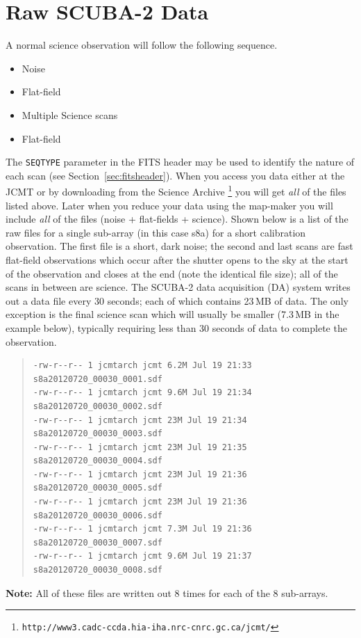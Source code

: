\documentclass[twoside,11pt]{article}
\newcommand{\htmladdnormallink}[2]{#1}
\newcommand{\htmlref}[2]{#1}
\newenvironment{latexonly}{}{}
\newcommand{\latexhtml}[2]{#1}
\newcommand{\xlabel}[1]{}
\renewcommand{\_}{\texttt{\symbol{95}}}
\newenvironment{myquote}{\begin{quote}\begin{small}}{\end{small}\end{quote}}
\newcommand{\param}[1]{\texttt{#1}}
\newcommand{\cref}[3]{\latexhtml{#1~\ref{#2}}{\htmlref{#3}{#2}}}
\begin{document}
\clearpage

\section{\xlabel{data_files}Raw SCUBA-2 Data}
\label{sec:raw}

A normal science observation will follow the following sequence.
\vspace{-2mm}
\begin{itemize}\itemsep-0.5em
\item Noise
\item Flat-field
\item Multiple Science scans
\item Flat-field
\end{itemize}
\vspace{-2mm}
The \param{SEQ\_TYPE} parameter in the FITS header may be used to
identify the nature of each scan (see
\cref{Section}{sec:fitsheader}{Headers and file structure}).
When you access you data either at the JCMT or by downloading from the
\htmladdnormallink{Science Archive}{http://www3.cadc-ccda.hia-iha.nrc-cnrc.gc.ca/jcmt/}
\begin{latexonly}
\footnote{\texttt{http://www3.cadc-ccda.hia-iha.nrc-cnrc.gc.ca/jcmt/}}
\end{latexonly}
you will get \emph{all} of the files listed above. Later when you
reduce your data using the map-maker you will include \emph{all} of
the files (noise + flat-fields + science).
Shown below is a list of the raw files for a single sub-array (in this
case s8a) for a short calibration observation. The first file is a
short, dark noise; the second and last scans are fast flat-field
observations which occur after the shutter opens to the sky at the
start of the observation and closes at the end (note the identical
file size); all of the scans in between are science. The SCUBA-2 data
acquisition (DA) system writes out a data file every 30 seconds; each
of which contains 23\,MB of data. The only exception is the final science
scan which will usually be smaller (7.3\,MB in the example below), typically
requiring less than 30 seconds of data to complete the observation.
\begin{myquote}
\begin{verbatim}
-rw-r--r-- 1 jcmtarch jcmt 6.2M Jul 19 21:33 s8a20120720_00030_0001.sdf
-rw-r--r-- 1 jcmtarch jcmt 9.6M Jul 19 21:34 s8a20120720_00030_0002.sdf
-rw-r--r-- 1 jcmtarch jcmt 23M Jul 19 21:34 s8a20120720_00030_0003.sdf
-rw-r--r-- 1 jcmtarch jcmt 23M Jul 19 21:35 s8a20120720_00030_0004.sdf
-rw-r--r-- 1 jcmtarch jcmt 23M Jul 19 21:36 s8a20120720_00030_0005.sdf
-rw-r--r-- 1 jcmtarch jcmt 23M Jul 19 21:36 s8a20120720_00030_0006.sdf
-rw-r--r-- 1 jcmtarch jcmt 7.3M Jul 19 21:36 s8a20120720_00030_0007.sdf
-rw-r--r-- 1 jcmtarch jcmt 9.6M Jul 19 21:37 s8a20120720_00030_0008.sdf
\end{verbatim}
\end{myquote}
\textbf{Note:} All of these files are written out 8 times for each of the
8 sub-arrays.
\end{document}
